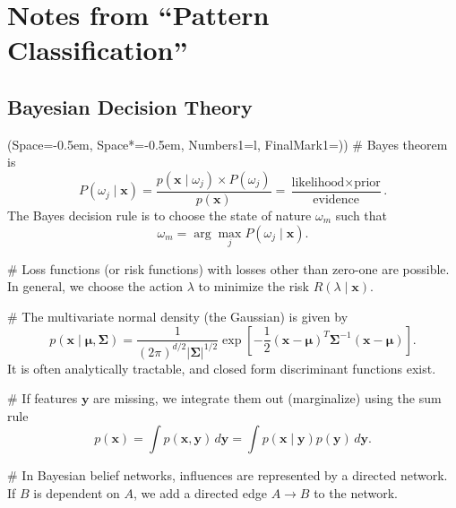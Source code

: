 \documentclass[12pt, a4paper]{article}
\title{\Title}
\author{\Author}
\newcommand{\listSpace}{-0.5em}%
\newcommand{\vect}[1]{\bm{#1}}
\newcommand{\abs}[1]{\left\lvert#1\right\rvert}
\begin{document}
	
\maketitle
\begin{abstract}
This document contains some notes and solutions to the book ``Pattern Classification'' by Duda et al.
\end{abstract}

\tableofcontents

\section{Notes from ``Pattern Classification''}
\setcounter{subsection}{1}
\subsection{Bayesian Decision Theory}
\begin{easylist}[itemize]
\ListProperties(Space=\listSpace, Space*=\listSpace, Numbers1=l, FinalMark1={)})
# Bayes theorem is
\begin{equation*}
	P(\omega_j \mid \vect{x}) = \frac{p(\vect{x} \mid \omega_j) \times P(\omega_j)}{p(\vect{x})}
	= \frac{\text{likelihood} \times \text{prior}}{\text{evidence}}.
\end{equation*}
The Bayes decision rule is to choose the state of nature $\omega_m$ such that
\begin{equation*}
	\omega_m = \arg \max_j P(\omega_j \mid \vect{x}).
\end{equation*}

# Loss functions (or risk functions) with losses other than zero-one are possible.
 In general, we choose the action $\lambda$ to minimize the risk $R(\lambda \mid \vect{x})$.
 
# The multivariate normal density (the Gaussian) is given by
\begin{equation*}
	p(\vect{x} \mid \vect{\mu}, \vect{\Sigma}) = \frac{1}{(2 \pi)^{d/2} \abs{\vect{\Sigma}}^{1/2}} 
	\exp \left[ - \frac{1}{2} 
	\left( \vect{x} - \vect{\mu} \right)^T \vect{\Sigma}^{-1} 
	\left( \vect{x} - \vect{\mu} \right) \right].
\end{equation*}
It is often analytically tractable, and closed form discriminant functions exist.

# If features $\vect{y}$ are missing, we integrate them out (marginalize) using the sum rule
\begin{equation*}
	p(\vect{x}) = \int p(\vect{x}, \vect{y}) \, d\vect{y} = \int p(\vect{x} \mid \vect{y}) p(\vect{y}) \, d\vect{y}.
\end{equation*}

# In Bayesian belief networks, influences are represented by a directed network.
If $B$ is dependent on $A$, we add a directed edge $A \to B$ to the network.
\end{easylist}
\end{document}
